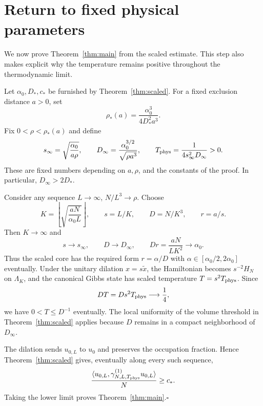 \section{Return to fixed physical parameters}\label{sec:physical}

We now prove Theorem~\ref{thm:main} from the scaled estimate. This step
also makes explicit why the temperature remains positive throughout the
thermodynamic limit.

Let $\alpha_0,D_*,c_*$ be furnished by Theorem~\ref{thm:scaled}. For a
fixed exclusion distance $a>0$, set
\[
 \rho_*(a)=\frac{\alpha_0^3}{4D_*^2a^3}.
\]
Fix $0<\rho<\rho_*(a)$ and define
\begin{equation}\label{eq:physical-temperature}
 s_\infty=\sqrt{\frac{\alpha_0}{a\rho}},\qquad
 D_\infty=\frac{\alpha_0^{3/2}}{\sqrt{\rho a^3}},\qquad
 T_{\rm phys}=\frac{1}{4s_\infty^2D_\infty}>0.
\end{equation}
These are fixed numbers depending on $a,\rho$, and the constants of the
proof. In particular, $D_\infty>2D_*$.

Consider any sequence $L\to\infty$, $N/L^3\to\rho$. Choose
\[
 K=\left\lfloor\sqrt{\frac{aN}{\alpha_0L}}\right\rfloor,
 \qquad s=L/K,\qquad D=N/K^3,\qquad r=a/s.
\]
Then $K\to\infty$ and
\[
 s\longrightarrow s_\infty,\qquad D\longrightarrow D_\infty,
 \qquad Dr=\frac{aN}{LK^2}\longrightarrow\alpha_0.
\]
Thus the scaled core has the required form $r=\alpha/D$ with
$\alpha\in[\alpha_0/2,2\alpha_0]$ eventually. Under the unitary dilation
$x=s\widetilde x$, the Hamiltonian becomes $s^{-2}H_N$ on $\Lambda_K$,
and the canonical Gibbs state has scaled temperature
$T=s^2T_{\rm phys}$. Since
\[
 DT=Ds^2T_{\rm phys}\longrightarrow\frac14,
\]
we have $0<T\le D^{-1}$ eventually. The local uniformity of the volume
threshold in Theorem~\ref{thm:scaled} applies because $D$ remains in a
compact neighborhood of $D_\infty$.

The dilation sends $u_{0,L}$ to $u_0$ and preserves the occupation
fraction. Hence Theorem~\ref{thm:scaled} gives, eventually along every
such sequence,
\[
 \frac{\langle u_{0,L},\gamma^{(1)}_{N,L,T_{\rm phys}}u_{0,L}\rangle}{N}
 \ge c_*.
\]
Taking the lower limit proves Theorem~\ref{thm:main}.\hfill$\square$
